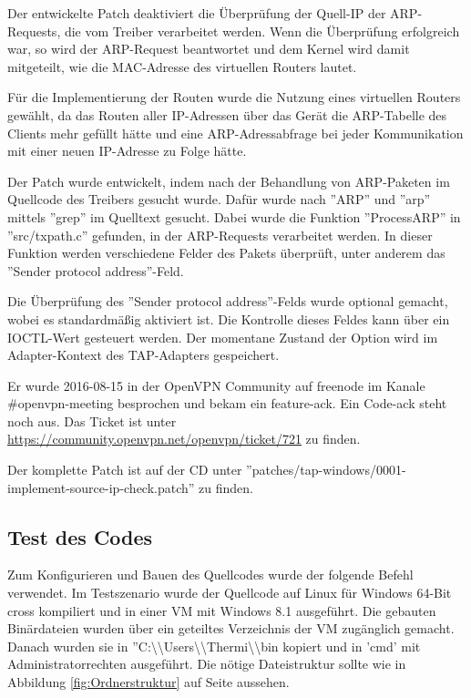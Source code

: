 {Der entwickelte Patch deaktiviert die Überprüfung der Quell-IP der \ac{ARP}-Requests, die
vom Treiber verarbeitet werden. Wenn die Überprüfung erfolgreich war, so wird der ARP-Request
beantwortet und dem Kernel wird damit mitgeteilt, wie die MAC-Adresse des virtuellen Routers lautet.

Für die Implementierung der Routen wurde die Nutzung eines virtuellen Routers gewählt,
da das Routen aller \ac{IP}-Adressen über das Gerät die \ac{ARP}-Tabelle des Clients
mehr gefüllt hätte und eine \ac{ARP}-Adressabfrage bei jeder Kommunikation mit einer neuen
\ac{IP}-Adresse zu Folge hätte.

Der Patch wurde entwickelt, indem nach der Behandlung von \ac{ARP}-Paketen im
Quellcode des Treibers gesucht wurde. Dafür wurde nach ''ARP'' und ''arp'' mittels
''grep'' im Quelltext gesucht. Dabei wurde die Funktion ''ProcessARP'' in ''src/txpath.c''
gefunden, in der \ac{ARP}-Requests verarbeitet werden. In dieser Funktion
werden verschiedene Felder des Pakets überprüft, unter anderem das ''Sender protocol address''-Feld.

Die Überprüfung des ''Sender protocol address''-Felds wurde optional gemacht, 
wobei es standardmäßig aktiviert ist. Die Kontrolle dieses
Feldes kann über ein IOCTL-Wert gesteuert werden. Der momentane Zustand der Option
wird im Adapter-Kontext des TAP-Adapters gespeichert.

Er wurde 2016-08-15 in der OpenVPN Community auf freenode im Kanale \#openvpn-meeting besprochen
und bekam ein feature-ack. Ein Code-ack steht noch aus. Das Ticket ist unter
\url{https://community.openvpn.net/openvpn/ticket/721} zu finden.

Der komplette Patch ist auf der CD unter 
''patches/tap-windows/0001-implement-source-ip-check.patch'' zu finden.


\subsection{Test des Codes}
Zum Konfigurieren und Bauen des Quellcodes wurde der folgende Befehl verwendet.
Im Testszenario wurde der Quellcode auf Linux für Windows 64-Bit cross kompiliert
und in einer \ac{VM} mit Windows 8.1 ausgeführt.
Die gebauten Binärdateien wurden über ein geteiltes Verzeichnis der \ac{VM}
zugänglich gemacht. Danach wurden sie in ''C:\textbackslash{}\textbackslash{}Users\textbackslash{}\textbackslash{}Thermi\textbackslash{}\textbackslash{}bin
kopiert und in 'cmd' mit Administratorrechten ausgeführt. 
Die nötige Dateistruktur sollte wie in Abbildung \ref{fig:Ordnerstruktur} 
auf Seite \pageref{fig:Ordnerstruktur} aussehen.

}

